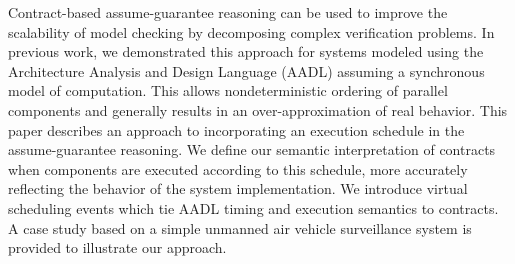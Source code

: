 Contract-based assume-guarantee reasoning can be used to improve the scalability of model checking
by decomposing complex verification problems.  In previous work, we demonstrated this approach 
for systems modeled using the Architecture Analysis and Design Language (AADL) assuming a 
synchronous model of computation.  This allows nondeterministic ordering of parallel components
and generally results in an over-approximation of real behavior.  
This paper describes an
approach to incorporating an execution schedule in the assume-guarantee reasoning. We define our semantic
interpretation of contracts when components are executed according to this schedule, 
more accurately reflecting the behavior of the system implementation. 
We introduce virtual scheduling events which tie AADL timing and execution semantics to contracts. 
A case study based on a simple unmanned air vehicle surveillance system is provided to illustrate our approach.

